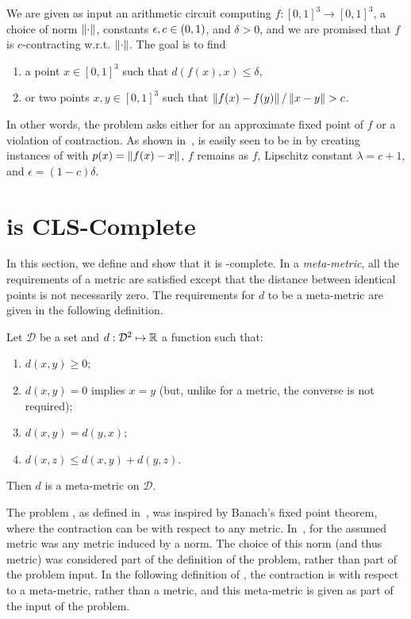 \begin{definition}
We are given as input an arithmetic circuit computing $f: [0,1]^3\to [0,1]^3$,
a choice of norm $\left\| \cdot \right\|$, constants \mbox{$\epsilon,c \in (0,1)$},
and $\delta > 0$, and we are promised that $f$ is $c$-contracting w.r.t. $\left\| \cdot \right\|$.
The goal is to find
\begin{enumerate}[label=(CM\arabic*)]
\item a point $x\in [0,1]^3$ such that $d(f(x),x) \leq \delta$, 
\item or two points $x,y\in [0,1]^3$ such that $\left\| f(x) - f(y) \right\|/\left\| x-y \right\| > c$. 
\end{enumerate}
\end{definition}

In other words, the problem asks either for an approximate fixed point of $f$ or
a violation of contraction. As shown in~\cite{daskalakis2011continuous}, \CM is
easily seen to be in \CLS by creating instances of \CLO with $p(x) =
\left\| f(x)-x \right\|$, $f$ remains as $f$, Lipschitz constant $\lambda = c+1$, and $\epsilon =
(1-c)\delta$.

\section{\MMCM is CLS-Complete}
\label{sec:MMCMisCLScomplete}

In this section, we define \MMCM and show that it is \CLS-complete.
In a \emph{meta-metric}, all the requirements of a metric are satisfied except
that the distance between identical points is not necessarily zero. The
requirements for $d$ to be a meta-metric are given in the following definition.

\begin{definition}
\label{def:metametric}
Let $\mathcal{D}$ be a set and $d:\mathcal{D}^2 \mapsto \mathbb{R}$ a function such that:
\begin{enumerate}
\item $d(x, y) \ge 0$;
\item $d(x, y) = 0$ implies $x = y$ (but, unlike for a metric, the converse is not required);
\item $d(x, y) = d(y, x)$;
\item $d(x, z) \le d(x, y) + d(y, z)$.
\end{enumerate}
Then $d$ is a meta-metric on $\mathcal{D}$.
\end{definition}

The problem \CM, as defined in~\cite{daskalakis2011continuous}, was inspired by
Banach's fixed point theorem, where the contraction can be with respect to any
metric.  In~\cite{daskalakis2011continuous}, for \CM the assumed metric was any
metric induced by a norm. The choice of this norm (and thus metric) was
considered part of the definition of the problem, rather than part of the
problem input. In the following definition of \MMCM, the contraction is with
respect to a meta-metric, rather than a metric, and this meta-metric is given as part of the input of
the problem.

